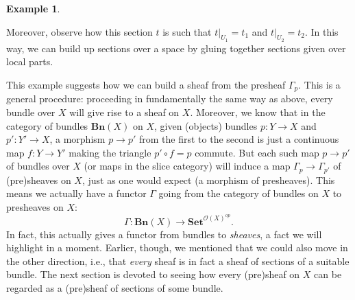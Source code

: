 \documentclass[a4paper]{book}
\theoremstyle{definition}
\newtheorem{example}{Example}[section]
\theoremstyle{definition}
\theoremstyle{definition}
\theoremstyle{theorem}
\theoremstyle{definition}
\begin{document}
\begin{example}
\begin{center}
	\end{center}   
	Moreover, observe how this section $t$ is such that $t|_{U_1} = t_1$ and $t|_{U_2} = t_2$. In this way, we can build up sections over a space by gluing together sections given over local parts.\par 
	This example suggests how we can build a sheaf from the presheaf $\Gamma_p$. This is a general procedure: proceeding in fundamentally the same way as above, every bundle over $X$ will give rise to a sheaf on $X$. Moreover, we know that in the category of bundles $\textbf{Bn}(X)$ on $X$, given (objects) bundles $p: Y \rightarrow X$ and $p': Y' \rightarrow X$, a morphism $p \rightarrow p'$ from the first to the second is just a continuous map $f: Y \rightarrow Y'$ making the triangle $p' \circ f = p$ commute. But each such map $p \rightarrow p'$ of bundles over $X$ (or maps in the slice category) will induce a map $\Gamma_p \rightarrow \Gamma_{p'}$ of (pre)sheaves on $X$, just as one would expect (a morphism of presheaves). This means we actually have a functor $\Gamma$ going from the category of bundles on $X$ to presheaves on $X$: 
	\begin{equation*}
	\Gamma: \textbf{Bn}(X) \rightarrow \textbf{Set}^{\mathscr{O}(X)^{op}}. 
	\end{equation*}
	In fact, this actually gives a functor from bundles to \textit{sheaves}, a fact we will highlight in a moment. Earlier, though, we mentioned that we could also move in the other direction, i.e., that \textit{every} sheaf is in fact a sheaf of sections of a suitable bundle. The next section is devoted to seeing how every (pre)sheaf on $X$ can be regarded as a (pre)sheaf of sections of some bundle. 

\end{example}
\end{document}
